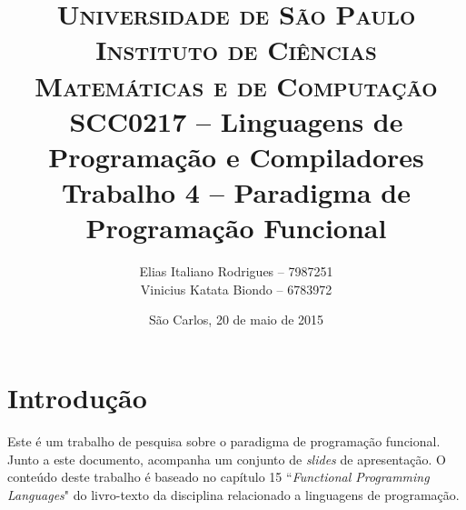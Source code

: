 \documentclass[a4paper, twoside, 12pt]{article}
\begin{document}
\setlength\parskip{0.3cm}


\begin{titlepage}

		\title{
\textsc {\large{Universidade de São Paulo\\
Instituto de Ciências Matemáticas e de Computação}}\\[1cm]
\large{SCC0217 -- Linguagens de Programação e Compiladores}\\[6cm]
\LARGE{Trabalho 4 -- Paradigma de Programação Funcional}\\[5.5cm]
		}

		\author{
Elias Italiano Rodrigues -- 7987251\\
Vinicius Katata Biondo -- 6783972
		}

		\date{
\vfill São Carlos, 20 de maio de 2015
		}

		\maketitle
		\thispagestyle{empty}

\end{titlepage}
	
\setcounter{page}{1}


\tableofcontents

\clearpage


\section{Introdução \label{sec:introducao}}

Este é um trabalho de pesquisa sobre o paradigma de programação funcional. Junto a este documento, acompanha um conjunto de \textit{slides} de apresentação. O conteúdo deste trabalho é baseado no capítulo 15 ``\textit{Functional Programming Languages}" do livro-texto \cite{bib:livro} da disciplina relacionado a linguagens de programação.
\end{document}
